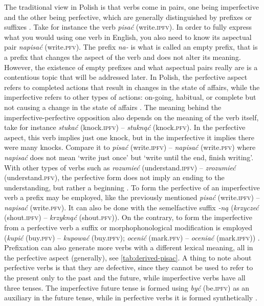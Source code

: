 \documentclass[12pt]{article}
\begin{document}
The traditional view in Polish is that verbs come in pairs, one being imperfective and the other being perfective, which are generally distinguished by prefixes or suffixes \parencite{nagorko2010PodrecznaGramatykaJezyka}. Take for instance the verb \textit{pisać} (write.\textsc{ipfv}). In order to fully express what you would using one verb in English, you also need to know its aspectual pair \textit{napisać} (write.\textsc{pfv}). The prefix \textit{na-} is what is called an empty prefix, that is a prefix that changes the aspect of the verb and does not alter its meaning. However, the existence of empty prefixes and what aspectual pairs really are is a contentious topic that will be addressed later. In Polish, the perfective aspect refers to completed actions that result in changes in the state of affairs, while the imperfective refers to other types of actions: on-going, habitual, or complete but not causing a change in the state of affairs \parencite{swan2002GrammarContemporaryPolish}. The meaning behind the imperfective-perfective opposition also depends on the meaning of the verb itself, take for instance \textit{stukać} (knock.\textsc{ipfv}) -- \textit{stuknąć} (knock.\textsc{pfv}). In the perfective aspect, this verb implies just one knock, but in the imperfective it implies there were many knocks. Compare it to \textit{pisać} (write.\textsc{ipfv}) -- \textit{napisać} (write.\textsc{pfv}) where \textit{napisać} does not mean `write just once' but `write until the end, finish writing'. With other types of verbs such as \textit{rozumieć} (understand.\textsc{ipfv}) -- \textit{zrozumieć} (understand.\textsc{pfv}), the perfective form does not imply an ending to the understanding, but rather a beginning  \parencite{nagorko2010PodrecznaGramatykaJezyka}.
To form the perfective of an imperfective verb a prefix may be employed, like the previously mentioned \textit{pisać} (write.\textsc{ipfv}) -- \textit{napisać} (write.\textsc{pfv}). It can also be done with the semelfactive suffix \textit{-ną} (\textit{krzyczeć} (shout.\textsc{ipfv}) -- \textit{krzyknąć} (shout.\textsc{pfv})). On the contrary, to form the imperfective from a perfective verb a suffix or morphophonological modification is employed (\textit{kupić} (buy.\textsc{pfv}) -- \textit{kupować} (buy.\textsc{ipfv}); \textit{ocenić} (mark.\textsc{pfv}) -- \textit{oceniać} (mark.\textsc{ipfv})) \parencite{bloch-trojnar2015GrammaticalAspectLexical}. 
Prefixation can also generate more verbs with a different lexical meaning, all in the perfective aspect (generally), see \autoref{tab:derived-pisac}. A thing to note about perfective verbs is that they are defective, since they cannot be used to refer to the present only to the past and the future, while imperfective verbs have all three tenses. The imperfective future tense is formed using \textit{być} (be.\textsc{ipfv}) as an auxiliary in the future tense, while in perfective verbs it is formed synthetically \parencite{willim2006EventIndividuationCountability}.
\end{document}
